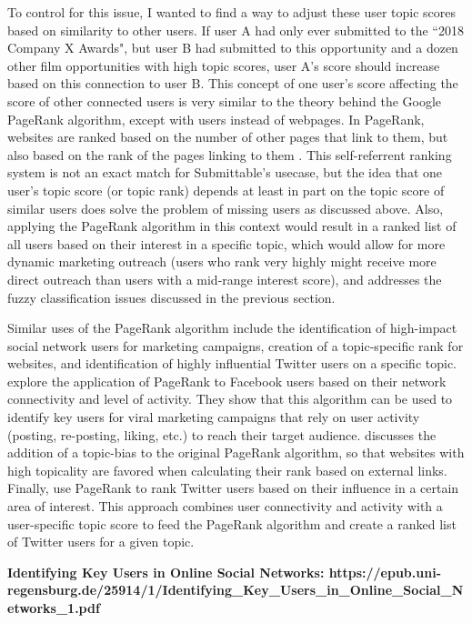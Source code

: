 \documentclass[]{report}   %
\begin{document}
To control for this issue, I wanted to find a way to adjust these user topic scores based on similarity to other users. If user A had only ever submitted to the ``2018 Company X Awards", but user B had submitted to this opportunity and a dozen other film opportunities with high topic scores, user A's score should increase based on this connection to user B. This concept of one user's score affecting the score of other connected users is very similar to the theory behind the Google PageRank algorithm, except with users instead of webpages. In PageRank, websites are ranked based on the number of other pages that link to them, but also based on the rank of the pages linking to them \cite{page_brin_motwani_winograd_1999}. This self-referrent ranking system is not an exact match for Submittable's usecase, but the idea that one user's topic score (or topic rank) depends at least in part on the topic score of similar users does solve the problem of missing users as discussed above. Also, applying the PageRank algorithm in this context would result in a ranked list of all users based on their interest in a specific topic, which would allow for more dynamic marketing outreach (users who rank very highly might receive more direct outreach than users with a mid-range interest score), and addresses the fuzzy classification issues discussed in the previous section.

Similar uses of the PageRank algorithm include the identification of high-impact social network users for marketing campaigns, creation of a topic-specific rank for websites, and identification of highly influential Twitter users on a specific topic.  explore the application of PageRank to Facebook users based on their network connectivity and level of activity. They show that this algorithm can be used to identify key users for viral marketing campaigns that rely on user activity (posting, re-posting, liking, etc.) to reach their target audience.   discusses the addition of a topic-bias to the original PageRank algorithm, so that websites with high topicality are favored when calculating their rank based on external links. Finally,  use PageRank to rank Twitter users based on their influence in a certain area of interest. This approach combines user connectivity and activity with a user-specific topic score to feed the PageRank algorithm and create a ranked list of Twitter users for a given topic.


\textbf{Identifying Key Users in Online Social Networks: https://epub.uni-regensburg.de/25914/1/Identifying\_Key\_Users\_in\_Online\_Social\_Networks\_1.pdf}
\end{document}
